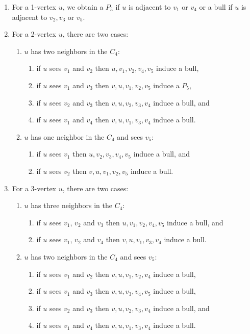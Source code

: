\documentclass[11pt]{article}
\newcommand{\0}{\text{ has a co-join to }}
\newcommand{\1}{\text{ has a join to }}
\begin{document}
\begin{enumerate}
\item For a 1-vertex $u$, we obtain a $P_5$ if $u$ is adjacent to $v_1$ or $v_4$ or a bull if $u$ is adjacent to $v_2,v_3$ or $v_5$. 

\item For a 2-vertex $u$, there are two cases: 

\begin{enumerate}
\item $u$ has two neighbors in the $C_4$:  
\begin{enumerate}
\item if $u$ sees $v_1$ and $v_2$ then $u,v_1,v_2,v_4,v_5$ induce a bull, 
\item if $u$ sees $v_1$ and $v_3$ then $v,u,v_1,v_2,v_5$ induce a $P_5$,      
\item if $u$ sees $v_2$ and $v_3$ then $v,u,v_2,v_3,v_4$ induce a bull, and
\item if $u$ sees $v_1$ and $v_4$ then $v,u,v_1,v_3,v_4$ induce a bull. 
\end{enumerate}

\item $u$ has one neighbor in the $C_4$ and sees $v_5$:
\begin{enumerate}
\item if $u$ sees $v_1$ then $u,v_2,v_3,v_4,v_5$ induce a bull, and 
\item if $u$ sees $v_2$ then $v,u,v_1,v_2,v_5$ induce a bull.      
\end{enumerate}
\end{enumerate}

\item For a 3-vertex $u$, there are two cases: 

\begin{enumerate}
\item $u$ has three neighbors in the $C_4$:  
\begin{enumerate}
\item if $u$ sees $v_1$, $v_2$ and $v_3$ then $u,v_1,v_2,v_4,v_5$ induce a bull, and 
\item if $u$ sees $v_1$, $v_2$ and $v_4$ then $v,u,v_1,v_3,v_4$ induce a bull.      
\end{enumerate}

\item $u$ has two neighbors in the $C_4$ and sees $v_5$:
\begin{enumerate}
\item if $u$ sees $v_1$ and $v_2$ then $v,u,v_1,v_2,v_4$ induce a bull, 
\item if $u$ sees $v_1$ and $v_3$ then $v,u,v_3,v_4,v_5$ induce a bull,      
\item if $u$ sees $v_2$ and $v_3$ then $v,u,v_2,v_3,v_4$ induce a bull, and 
\item if $u$ sees $v_1$ and $v_4$ then $v,u,v_1,v_3,v_4$ induce a bull.          
\end{enumerate}
\end{enumerate}


\end{enumerate}
\end{document}
